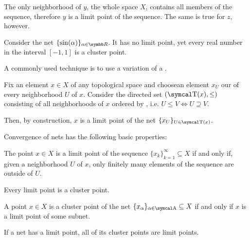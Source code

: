 \begin{proposition}
\begin{example}
  The only neighborhood of \( y \), the whole space \( X \), contains all members of the sequence, therefore \( y \) is a limit point of the sequence. The same is true for \( z \), however.
\end{example}

\begin{example}\label{ex:cluster_points/sine}
  Consider the net \( \{ \sin(\al) \}_{\al \in \BR} \). It has no limit point, yet every real number in the interval \( [-1, 1] \) is a cluster point.
\end{example}

\begin{example}\label{ex:reverse_inclusion_net}
  A commonly used technique is to use a variation of a .

  Fix an element \( x \in X \) of any topological space and choose\LEM an element \( x_U \) our of every neighborhood \( U \) of \( x \). Consider the directed set \( (\CT(x), \leq) \) consisting of all neighborhoods of \( x \) ordered by , i.e. \( U \leq V \iff U \supseteq V \).

  Then, by construction, \( x \) is a limit point of the net \( \{ x_U \}_{U \in \CT(x)} \).
\end{example}

\begin{proposition}\label{thm:net_convergence_properties}
  Convergence of nets has the following basic properties:

  \begin{propenum}
     The point \( x \in X \) is a limit point of the sequence \( \{ x_k \}_{k=1}^\infty \subseteq X \) if and only if, given a neighborhood \( U \) of \( x \), only finitely many elements of the sequence are outside of \( U \).

     Every limit point is a cluster point.

     A point \( x \in X \) is a cluster point of the net \( \{ x_\al \}_{\al \in \CA} \subseteq X \) if and only if \( x \) is a limit point of some subnet.

     If a net has a limit point, all of its cluster points are limit points.


\end{propenum}
\end{proposition}
\end{proposition}

